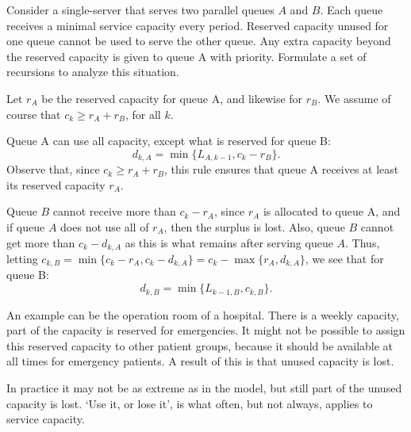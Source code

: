 \begin{exercise} 
 Consider a single-server that serves two parallel queues $A$ and $B$.
 Each queue receives a minimal service capacity every period.
 Reserved capacity unused for one queue cannot be used to serve the other queue.
 Any extra capacity beyond the reserved capacity is given to queue A with priority.
 Formulate a set of recursions to analyze this situation.

 Let $r_A$ be the reserved capacity for queue A, and likewise for
 $r_B$. We assume of course that $c_k\geq r_A + r_B$, for all $k$.
\begin{solution} Queue A can use all capacity, except what is
 reserved for queue B:
\begin{equation*}
 d_{k,A} = \min\{L_{A, k-1}, c_k - r_B\}.
\end{equation*}
Observe that, since $c_k \geq r_A + r_B$, this rule ensures that queue
A receives at least its reserved capacity $r_A$.

Queue $B$ cannot receive more than $c_k-r_A$, since $r_A$ is allocated
to queue A, and if queue $A$ does not use all of $r_A$, then the
surplus is lost. Also, queue $B$ cannot get more than $c_k - d_{k,A}$
as this is what remains after serving queue $A$. Thus, letting
$c_{k,B} = \min\{c_k-r_A, c_k-d_{k,A}\} = c_k - \max\{r_A, d_{k,A}\}$,
we see that for queue B:
\begin{equation*}
 d_{k,B} = \min\{L_{k-1, B}, c_{k,B}\}.
\end{equation*}

An example can be the operation room of a hospital.
There is a weekly capacity, part of the capacity is reserved for emergencies.
It might not be possible to assign this reserved capacity to other patient groups, because it should be available at all times for emergency patients.
A result of this is that unused capacity is lost.

In practice it may not be as extreme as in the model, but still part
of the unused capacity is lost. `Use it, or lose it', is what often,
but not always, applies to service capacity.
\end{solution}
\end{exercise}




